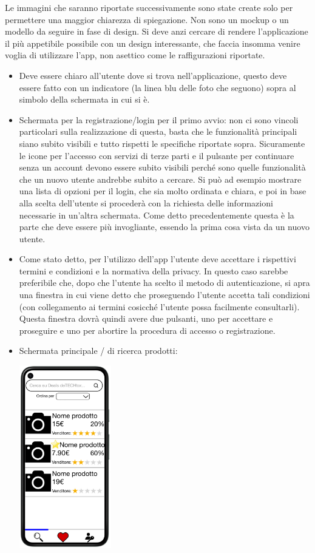 \documentclass{article}
\begin{document}
Le immagini che saranno riportate successivamente sono state create solo per permettere una maggior chiarezza di  spiegazione. Non sono
un mockup o un modello da seguire in fase di design. Si deve anzi cercare di rendere  l’applicazione il più appetibile possibile con un
design interessante, che faccia insomma venire voglia di utilizzare  l’app, non asettico come le raffigurazioni riportate.
\begin{itemize}
        \item Deve essere chiaro all’utente dove si trova nell’applicazione, questo deve essere fatto con un indicatore (la linea blu delle
                foto che seguono) sopra al simbolo della schermata in cui si è.
        \item Schermata per la registrazione/login per il primo avvio: non ci sono vincoli particolari sulla realizzazione di  questa,
                basta che le funzionalità principali siano subito visibili e tutto rispetti le specifiche riportate sopra. 
                Sicuramente le icone per l’accesso con servizi di terze parti e il pulsante per continuare senza un account devono essere
                subito visibili perché sono quelle funzionalità che un nuovo utente andrebbe subito a cercare. Si può ad esempio mostrare una
                lista di opzioni per il login, che sia molto ordinata e chiara, e poi in base alla  scelta dell’utente si procederà con la
                richiesta delle informazioni necessarie in un’altra schermata. Come  detto precedentemente questa è la parte che deve essere
                più invogliante, essendo la prima cosa vista da un  nuovo utente.
        \item Come stato detto, per l’utilizzo dell’app l’utente deve accettare i rispettivi termini e condizioni e la normativa  della privacy.
                In questo caso sarebbe preferibile che, dopo che l’utente ha scelto il metodo di autenticazione,  si apra una finestra in cui viene
                detto che proseguendo l’utente accetta tali condizioni (con collegamento ai  termini cosicché l’utente possa facilmente consultarli).
                Questa finestra dovrà quindi avere due pulsanti, uno  per accettare e proseguire e uno per abortire la procedura di accesso o
                registrazione.
        \item Schermata principale / di ricerca prodotti:
        \begin{center}
                \includegraphics[width=40mm,scale=0.5]{ricerca.PNG}

\end{center}
\end{itemize}
\end{document}
